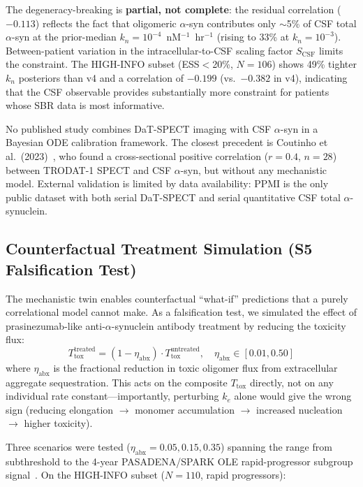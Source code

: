 The degeneracy-breaking is \textbf{partial, not complete}: the residual correlation ($-0.113$) reflects the fact that oligomeric $\alpha$-syn contributes only $\sim$5\% of CSF total $\alpha$-syn at the prior-median $k_n = 10^{-4}$~nM$^{-1}$~hr$^{-1}$ (rising to 33\% at $k_n = 10^{-3}$). Between-patient variation in the intracellular-to-CSF scaling factor $S_\text{CSF}$ limits the constraint. The HIGH-INFO subset (ESS${}<$20\%, $N=106$) shows 49\% tighter $k_n$ posteriors than v4 and a correlation of $-0.199$ (vs.\ $-0.382$ in v4), indicating that the CSF observable provides substantially more constraint for patients whose SBR data is most informative.

No published study combines DaT-SPECT imaging with CSF $\alpha$-syn in a Bayesian ODE calibration framework. The closest precedent is Coutinho et al.\ (2023)~\cite{coutinho2023}, who found a cross-sectional positive correlation ($r=0.4$, $n=28$) between TRODAT-1 SPECT and CSF $\alpha$-syn, but without any mechanistic model. External validation is limited by data availability: PPMI is the only public dataset with both serial DaT-SPECT and serial quantitative CSF total $\alpha$-synuclein.

\subsection{Counterfactual Treatment Simulation (S5 Falsification Test)}
\label{sec:mech-counterfactual}

The mechanistic twin enables counterfactual ``what-if'' predictions that a purely correlational model cannot make. As a falsification test, we simulated the effect of prasinezumab-like anti-$\alpha$-synuclein antibody treatment by reducing the toxicity flux:
\begin{equation}
T_\text{tox}^\text{treated} = (1 - \eta_\text{abx}) \cdot T_\text{tox}^\text{untreated}, \quad \eta_\text{abx} \in [0.01, 0.50]
\label{eq:counterfactual}
\end{equation}
where $\eta_\text{abx}$ is the fractional reduction in toxic oligomer flux from extracellular aggregate sequestration. This acts on the composite $T_\text{tox}$ directly, not on any individual rate constant---importantly, perturbing $k_e$ alone would give the wrong sign (reducing elongation $\rightarrow$ monomer accumulation $\rightarrow$ increased nucleation $\rightarrow$ higher toxicity).

Three scenarios were tested ($\eta_\text{abx} = 0.05, 0.15, 0.35$) spanning the range from subthreshold to the 4-year PASADENA/SPARK OLE rapid-progressor subgroup signal~\cite{pagano2024subgroup}. On the HIGH-INFO subset ($N=110$, rapid progressors):

